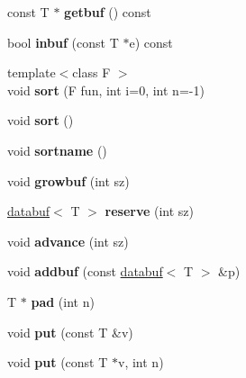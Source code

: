 \begin{DoxyCompactItemize}
const T $\ast$ {\bfseries getbuf} () const
\item 
\mbox{\label{structvector_a1597d5f5683b5666dca9edf2365c6c27}} 
bool {\bfseries inbuf} (const T $\ast$e) const
\item 
\mbox{\label{structvector_aa8ed3bcb552484154fb959aa1f02a3a0}} 
{\footnotesize template$<$class F $>$ }\\void {\bfseries sort} (F fun, int i=0, int n=-\/1)
\item 
\mbox{\label{structvector_a2f7b573d71c078d65dc0e40b8409b700}} 
void {\bfseries sort} ()
\item 
\mbox{\label{structvector_a0feade3a2946e44e2e13759fbe6bfd72}} 
void {\bfseries sortname} ()
\item 
\mbox{\label{structvector_a500a5fefd99c45e122ffdedaf8cb55b6}} 
void {\bfseries growbuf} (int sz)
\item 
\mbox{\label{structvector_aeafc05147e62c1e6a8f163c20b9ddf62}} 
\hyperlink{structdatabuf}{databuf}$<$ T $>$ {\bfseries reserve} (int sz)
\item 
\mbox{\label{structvector_ac4030f469794397798fff6928ea9b91c}} 
void {\bfseries advance} (int sz)
\item 
\mbox{\label{structvector_a5c232d5d8e81ee353c64ad51745fff54}} 
void {\bfseries addbuf} (const \hyperlink{structdatabuf}{databuf}$<$ T $>$ \&p)
\item 
\mbox{\label{structvector_ab7afc277fe11b5c37edce44122362156}} 
T $\ast$ {\bfseries pad} (int n)
\item 
\mbox{\label{structvector_ac3d44f0f942b1210dc91b8a3e8e88cc5}} 
void {\bfseries put} (const T \&v)
\item 
\mbox{\label{structvector_a9231b000547521ee4c24bfc1c53a48d3}} 
void {\bfseries put} (const T $\ast$v, int n)
\item 
\mbox{\label{structvector_a32cb8f72325a5f52298ffac9abd8d102}} 

\end{DoxyCompactItemize}
